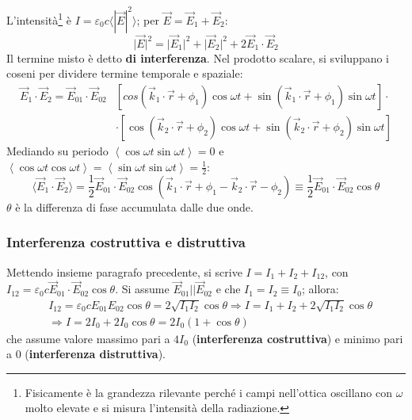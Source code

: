 \documentclass[a4paper]{scrartcl}
\numberwithin{equation}{subsection}
\theoremstyle{style1}
\begin{document}
L'intensit\`a\footnote{Fisicamente \`e la grandezza rilevante perch\'e i campi nell'ottica oscillano con $\omega$ molto elevate e si misura l'intensit\`a della radiazione.} \`e $I = \varepsilon _0 c \langle |\vec{E}| ^2 \rangle$; per $\vec{E}= \vec{E}_1 + \vec{E}_2$:
\begin{equation}
	\lvert \vec{E} \rvert ^2 = \lvert \vec{E}_1 \rvert ^2 + \lvert \vec{E}_2 \rvert ^2+2 \vec{E}_1 \cdot \vec{E}_2
\end{equation}
Il termine misto \`e detto \textbf{di interferenza}. Nel prodotto scalare, si sviluppano i coseni per dividere termine temporale e spaziale:
\[
	\begin{split}
		\vec{E}_1 \cdot \vec{E}_2 = \vec{E}_{01} \cdot \vec{E}_{02} &\left[ cos(\vec{k}_1 \cdot \vec{r}+\phi _1) \cos\omega t + \sin(\vec{k}_1 \cdot \vec{r}+\phi _1) \sin\omega t \right]\cdot \\
									    &\cdot \left[ \cos(\vec{k}_2\cdot \vec{r}+\phi _2) \cos \omega t + \sin(\vec{k}_2 \cdot \vec{r}+\phi _2) \sin \omega t\right] 
	\end{split}
\] 
Mediando su periodo $\left\langle \cos \omega t \sin \omega t \right\rangle=0 $ e $\left\langle \cos \omega t \cos\omega t \right\rangle=\left\langle \sin\omega t \sin\omega t \right\rangle = \frac{1}{2}$:
\begin{equation}
	\langle  \vec{E}_1 \cdot \vec{E}_2\rangle= \frac{1}{2 } \vec{E}_{01} \cdot \vec{E}_{02} \cos(\vec{k}_1 \cdot \vec{r} + \phi _1 - \vec{k}_2 \cdot \vec{r}-\phi _2)\equiv\frac{1}{2 } \vec{E}_{01} \cdot \vec{E}_{02} \cos \theta 
\end{equation}
$\theta $ \`e la differenza di fase accumulata dalle due onde.
\subsubsection{Interferenza costruttiva e distruttiva}
Mettendo insieme paragrafo precedente, si scrive $I = I_1 + I_2 + I_{12} $, con $I_{12} = \varepsilon _0 c \vec{E}_{01} \cdot \vec{E}_{02} \cos\theta $. Si assume $\vec{E}_{01} | | \vec{E}_{02} $ e che $I_1 = I_2 \equiv I_0$; allora:
\begin{equation}
	\begin{split}
		&I_{12}= \varepsilon _0 c E_{01}E_{02}\cos\theta =2 \sqrt{I_1I_2} \cos\theta \Rightarrow I = I_1+I_2+2 \sqrt{I_1I_2} \cos\theta \\
		&\Rightarrow I = 2 I_0 + 2 I_0 \cos \theta = 2I_0(1+ \cos\theta )
	\end{split}
\end{equation}
che assume valore massimo pari a $4I_0$ (\textbf{interferenza costruttiva}) e minimo pari a $0$ (\textbf{interferenza distruttiva}).
\end{document}
